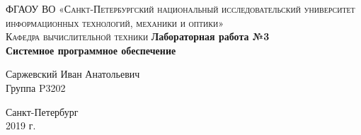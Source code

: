 \begin{titlepage}
\begin{center}

\textsc{ФГАОУ ВО «Санкт-Петербургский национальный исследовательский университет информационных технологий, механики и оптики»\\[4mm]
Кафедра вычислительной техники}
\vfill
\textbf{Лабораторная работа №3\\[4mm]
Системное программное обеспечение\\[16mm]
}
\begin{flushright}
Саржевский Иван Анатольевич
\\[2mm]Группа P3202
\end{flushright}
\vfill
Санкт-Петербург\\[2mm]
2019 г.

\end{center}
\end{titlepage}
